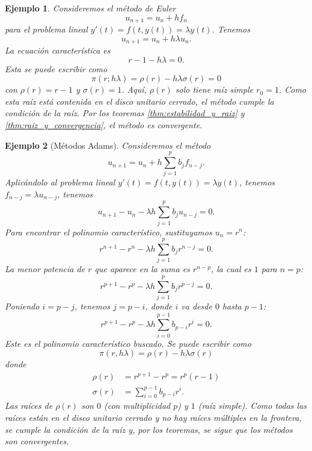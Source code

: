 \documentclass[11pt,letterpaper]{article}
\newtheorem{example}{Ejemplo}
\begin{document}
\begin{example}
  Consideremos el método de Euler
  \begin{equation}
    u_{n+1} = u_n + hf_n
  \end{equation}
  para el problema lineal $y'(t)=f(t,y(t))=\lambda y(t)$.
  Tenemos
  \begin{equation}
    u_{n+1} = u_n + h\lambda u_n
  .\end{equation}
  La ecuación característica es
  \begin{equation}
    r - 1 - h\lambda = 0
  .\end{equation}
  Esta se puede escribir como
  \begin{equation}
    \pi(r;h\lambda) = \rho(r) - h\lambda\sigma(r) = 0
  \end{equation}
  con $\rho(r)=r-1$ y $\sigma(r)=1$.
  Aquí, $\rho(r)$ solo tiene raíz simple $r_0=1$. Como esta raíz está
  contenida en el disco unitario cerrado, el método cumple la
  condición de la raíz. Por los teoremas
  \ref{thm:estabilidad_y_raiz} y \ref{thm:raiz_y_convergencia}, 
  el método es convergente.
\end{example}

\begin{example}[Métodos Adams]
  Consideremos el método
  \begin{equation}
    u_{n+1} = u_n + h \sum_{j=1}^{p}b_jf_{n-j}
  .\end{equation}
  Aplicándolo al problema lineal $y'(t)=f(t,y(t))=\lambda y(t)$,
  tenemos $f_{n-j}=\lambda u_{n-j}$, tenemos
  \begin{equation}
    u_{n+1} - u_n - \lambda h \sum_{j=1}^{p}b_ju_{n-j} = 0
  .\end{equation}
  Para encontrar el polinomio característico, sustituyamos
  $u_n=r^n$:
  \begin{equation}
    r^{n+1} - r^n - \lambda h \sum_{j=1}^{p}b_jr^{n-j} = 0
  .\end{equation}
  La menor potencia de $r$ que aparece en la suma es $r^{n-p}$,
  la cual es $1$ para $n=p$:
  \begin{equation}
    r^{p+1} - r^p - \lambda h \sum_{j=1}^{p}b_jr^{p-j} = 0
  .\end{equation}
  Poniendo $i=p-j$, tenemos $j=p-i$, donde $i$ va desde $0$ hasta
  $p-1$:
  \begin{equation}
    r^{p+1} - r^p - \lambda h \sum_{i=0}^{p-1}b_{p-i}r^{i} = 0
  .\end{equation}
  Este es el polinomio característico buscado. Se puede escribir como
  \begin{equation}
    \pi(r,h\lambda) = \rho(r) - h\lambda\sigma(r)
  \end{equation}
  donde
  \begin{align}
    \rho(r) &= r^{p+1}-r^p = r^p(r-1) \\
    \sigma(r) &= \sum_{i=0}^{p-1}b_{p-i}r^{i}
  .\end{align}
  Las raíces de $\rho(r)$ son $0$ (con multiplicidad $p$) y $1$ (raíz
  simple). Como todas las raíces están en el disco unitario cerrado y
  no hay raíces múltiples en la frontera, se cumple la condición de la
  raíz y, por los teoremas, se sigue que los métodos son convergentes.
\end{example}
\end{document}
